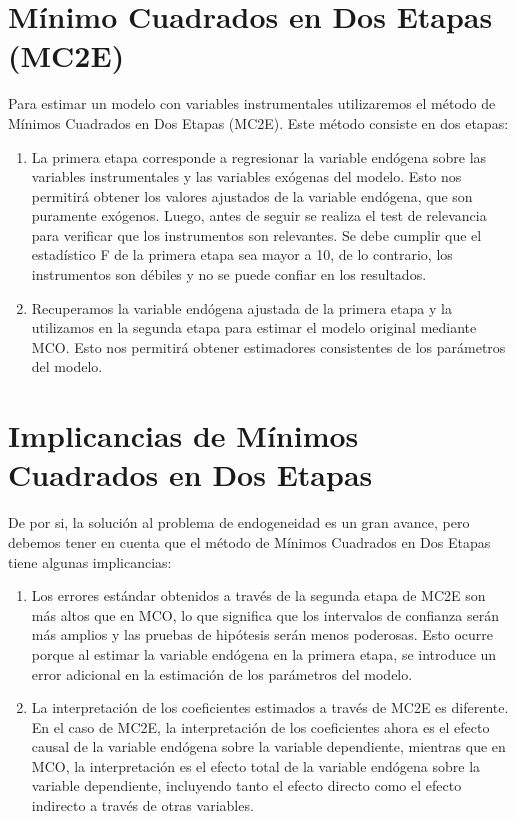 \documentclass[
]{book}
\providecommand{\tightlist}{%
  \setlength{\itemsep}{0pt}\setlength{\parskip}{0pt}}
\begin{document}
\section{Mínimo Cuadrados en Dos Etapas (MC2E)}\label{muxednimo-cuadrados-en-dos-etapas-mc2e}

Para estimar un modelo con variables instrumentales utilizaremos el método de Mínimos Cuadrados en Dos Etapas (MC2E). Este método consiste en dos etapas:

\begin{enumerate}
\def\labelenumi{\arabic{enumi}.}
\tightlist
\item
  La primera etapa corresponde a regresionar la variable endógena sobre las variables instrumentales y las variables exógenas del modelo. Esto nos permitirá obtener los valores ajustados de la variable endógena, que son puramente exógenos. Luego, antes de seguir se realiza el test de relevancia para verificar que los instrumentos son relevantes. Se debe cumplir que el estadístico F de la primera etapa sea mayor a 10, de lo contrario, los instrumentos son débiles y no se puede confiar en los resultados.
\item
  Recuperamos la variable endógena ajustada de la primera etapa y la utilizamos en la segunda etapa para estimar el modelo original mediante MCO. Esto nos permitirá obtener estimadores consistentes de los parámetros del modelo.
\end{enumerate}

\section{Implicancias de Mínimos Cuadrados en Dos Etapas}\label{implicancias-de-muxednimos-cuadrados-en-dos-etapas}

De por si, la solución al problema de endogeneidad es un gran avance, pero debemos tener en cuenta que el método de Mínimos Cuadrados en Dos Etapas tiene algunas implicancias:

\begin{enumerate}
\def\labelenumi{\arabic{enumi}.}
\tightlist
\item
  Los errores estándar obtenidos a través de la segunda etapa de MC2E son más altos que en MCO, lo que significa que los intervalos de confianza serán más amplios y las pruebas de hipótesis serán menos poderosas. Esto ocurre porque al estimar la variable endógena en la primera etapa, se introduce un error adicional en la estimación de los parámetros del modelo.
\item
  La interpretación de los coeficientes estimados a través de MC2E es diferente. En el caso de MC2E, la interpretación de los coeficientes ahora es el efecto causal de la variable endógena sobre la variable dependiente, mientras que en MCO, la interpretación es el efecto total de la variable endógena sobre la variable dependiente, incluyendo tanto el efecto directo como el efecto indirecto a través de otras variables.
\end{enumerate}
\end{document}
